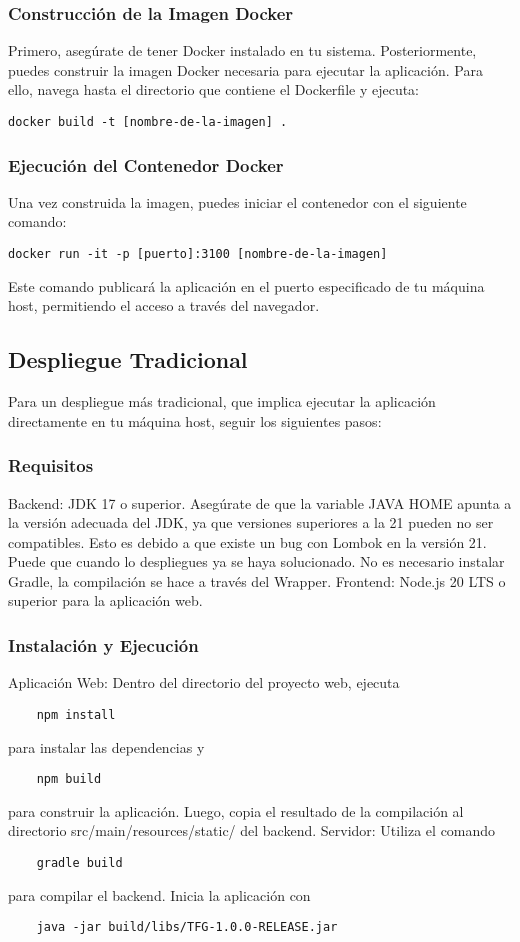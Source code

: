 \subsubsection{Construcción de la Imagen Docker}
Primero, asegúrate de tener Docker instalado en tu sistema. Posteriormente, puedes construir la imagen Docker necesaria para ejecutar la aplicación. Para ello, navega hasta el directorio que contiene el Dockerfile y ejecuta:
\begin{verbatim}
docker build -t [nombre-de-la-imagen] .
\end{verbatim}
\subsubsection{Ejecución del Contenedor Docker}
Una vez construida la imagen, puedes iniciar el contenedor con el siguiente comando:
\begin{verbatim}
docker run -it -p [puerto]:3100 [nombre-de-la-imagen]
\end{verbatim}
Este comando publicará la aplicación en el puerto especificado de tu máquina host, permitiendo el acceso a través del navegador.
\subsection{Despliegue Tradicional}
Para un despliegue más tradicional, que implica ejecutar la aplicación directamente en tu máquina host, seguir los siguientes pasos:
\subsubsection{Requisitos}
Backend: JDK 17 o superior. Asegúrate de que la variable JAVA HOME apunta a la versión adecuada del JDK, ya que versiones superiores a la 21 pueden no ser compatibles. Esto es debido a que existe un bug con Lombok en la versión 21. Puede que cuando lo despliegues ya se haya solucionado. No es necesario instalar Gradle, la compilación se hace a través del Wrapper.
Frontend: Node.js 20 LTS o superior para la aplicación web.
\subsubsection{Instalación y Ejecución}
Aplicación Web: Dentro del directorio del proyecto web, ejecuta 
\begin{verbatim}
    npm install
\end{verbatim} 
para instalar las dependencias y 
\begin{verbatim}
    npm build
\end{verbatim} 
para construir la aplicación. Luego, copia el resultado de la compilación al directorio src/main/resources/static/ del backend.
Servidor: Utiliza el comando 
\begin{verbatim}
    gradle build
\end{verbatim} 
para compilar el backend. Inicia la aplicación con 
\begin{verbatim}
    java -jar build/libs/TFG-1.0.0-RELEASE.jar
\end{verbatim}
